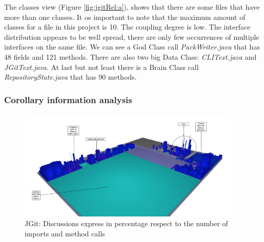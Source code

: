 \documentclass[]{usiinfbachelorproject}
\begin{document}
The classes view (Figure \ref{fig:jgitRel:a}), shows that there are some files that have more than one classes. It os important to note that the maximum amount of classes for a file in this project is 10. The coupling degree is low. The interface distribution appears to be well spread, there are only few occurrences of multiple interfaces on the same file. We can see a God Class call  \textit{PackWriter.java} that has 48 fields and 121 methods. There are also two big Data Class: \textit{CLIText.java} and \textit{JGitText.java}. At last but not least there is a Brain Class call  \textit{RepositoryState.java} that has 90 methods.
 


 \subsubsection{Corollary information analysis}
 
 
 
\begin{figure}[H]
	\centering
	\includegraphics[width=0.95\textwidth]{images/jgitDiscussion}
	\caption[JGit: Discussions]{JGit: Discussions express in percentage respect to the number of imports and method calls \label{fig:jgitCorrollary:a}}
\end{figure}
\end{document}
